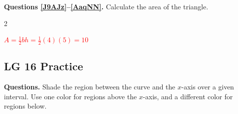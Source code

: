 \documentclass[answers]{exam}
\begin{document}
\textbf{Questions \ref{J9AJz}--\ref{AaqNN}.} Calculate the area of the triangle.

\begin{questions}
\begin{multicols}{2}



\question \label{J9AJz}
\phantom{.}


\ifprintanswers
\textcolor{red}{$\displaystyle A = \frac{1}{2} b h = \frac{1}{2}(4)(5) = \boxed{10}$}
\fi

\question
\phantom{.}


\question
\phantom{.}


\begin{minipage}{\linewidth}
\question
\phantom{.}

\end{minipage}


\question
\phantom{.}



\question \label{AaqNN}
\phantom{.}



\end{multicols}
\end{questions}


\clearpage

\subsection*{LG 16 Practice}

\textbf{Questions.} Shade the region between the curve and the $x$-axis over a given interval. Use one color for regions above the $x$-axis, and a different color for regions below.
\end{document}
